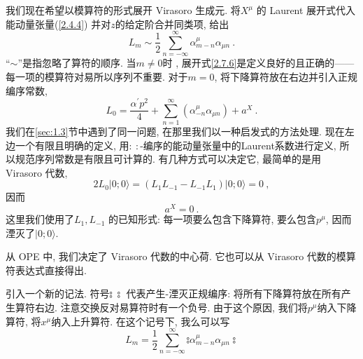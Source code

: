 我们现在希望以模算符的形式展开 Virasoro 生成元. 将$X^\mu$ 的 Laurent 展开式代入能动量张量(\ref{2.4.4}) 并对$z$的给定阶合并同类项, 给出
\begin{equation}\label{2.7.6}
L_{m} \sim \frac{1}{2} \sum_{n=-\infty}^{\infty} \alpha_{m-n}^{\mu} \alpha_{\mu n} \:.
\end{equation}
``$\sim$''是指忽略了算符的顺序. 当$m\neq 0$时 , 展开式\eqref{2.7.6}是定义良好的且正确的——每一项的模算符对易所以序列不重要. 对于$m=0$, 
将下降算符放在右边并引入正规编序常数,
\begin{equation}
 	L_{0}=\frac{\alpha^{\prime} p^{2}}{4}+\sum_{n=1}^{\infty}\left(\alpha_{-n}^{\mu} \alpha_{\mu n}\right)+a^{X} \:. \label{2.7.7}
\end{equation}
我们在\ref{sec:1.3}节中遇到了同一问题, 在那里我们以一种启发式的方法处理. 现在左边一个有限且明确的定义, 用$\mathrel{:\::}$-编序的能动量张量中的Laurent系数进行定义, 所以规范序列常数是有限且可计算的. 有几种方式可以决定它, 最简单的是用 Virasoro 代数,
 \begin{equation}\label{2.7.8}
 2 L_{0}|0 ; 0\rangle=(L_{1} L_{-1}-L_{-1} L_{1})|0 ; 0\rangle=0  \:,
 \end{equation}
因而
 \begin{equation}
 a^{X}=0 \:. \label{2.7.9}
 \end{equation}
这里我们使用了$L_1, L_{-1}$ 的已知形式: 每一项要么包含下降算符, 要么包含$p^\mu$, 因而湮灭了$|0 ; 0\rangle$. 

从 OPE 中, 我们决定了 Virasoro 代数的中心荷. 它也可以从 Virasoro 代数的模算符表达式直接得出.

引入一个新的记法. 符号$ \mathrel{\typecolon \:\typecolon}$ 代表产生-湮灭正规编序: 将所有下降算符放在所有产生算符右边. 注意交换反对易算符时有一个负号. 
由于这个原因, 我们将$p^\mu$纳入下降算符, 将$x^\mu$纳入上升算符. 在这个记号下, 我么可以写
\begin{equation}\label{2.7.10}
L_{m}=\frac{1}{2} \sum_{n=-\infty}^{\infty}\mathrel{ \typecolon\alpha_{m-n}^{\mu} \alpha_{\mu n}\typecolon}
\end{equation}



